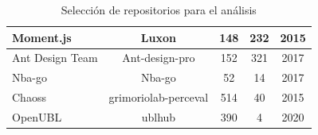 \documentclass[a4paper, 12pt]{book}
\begin{document}
\begin{table}
\begin{center}
\begin{tabular}{ | l | c | c | c | c |}
    Moment.js                  & Luxon                          & 148                            & 232                      & 2015                                 \\ \hline
    Ant Design Team            & Ant-design-pro                 & 152                            & 321                      & 2017                                 \\ \hline
    Nba-go                     & Nba-go                         & 52                             & 14                       & 2017                                 \\ \hline
    Chaoss                     & grimoriolab-perceval           & 514                            & 40                       & 2015                                 \\ \hline
    OpenUBL                    & ublhub                         & 390                            & 4                        & 2020                                 \\ 
    \hline
  \end{tabular}
  \caption{Selección de repositorios para el análisis}
  \label{tab:repositorios}
 \end{center}
\end{table}
\end{document}
